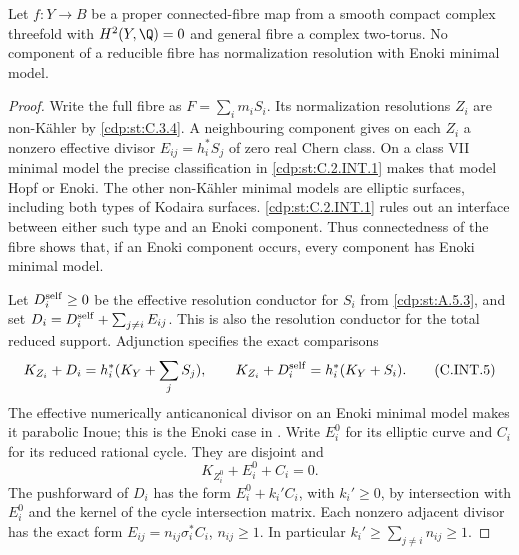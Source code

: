 
\begin{proposition}\label{cdp:st:C.2.INT.2}

Let $f:Y\to B$ be a proper connected-fibre map from a
smooth compact complex threefold with $H^2(Y,\Q)=0$
and general fibre a complex two-torus. No component
of a reducible fibre has normalization resolution
with Enoki minimal model.
\end{proposition}
\begin{proof}
Write the full fibre as $F=\sum_i m_iS_i$. Its
normalization resolutions $Z_i$ are non-K\"ahler by
\ref{cdp:st:C.3.4}. A neighbouring component gives on each $Z_i$
a nonzero effective divisor $E_{ij}=h_i^*S_j$ of
zero real Chern class. On a class VII minimal model
the precise classification in \ref{cdp:st:C.2.INT.1} makes that
model Hopf or Enoki. The other non-K\"ahler minimal
models are elliptic surfaces, including both types
of Kodaira surfaces. \ref{cdp:st:C.2.INT.1} rules out an interface
between either such type and an Enoki component.
Thus connectedness of the fibre shows that, if an
Enoki component occurs, every component has Enoki
minimal model.

Let $D_i^{\rm self}\ge0$ be the effective resolution
conductor for $S_i$ from \ref{cdp:st:A.5.3}, and set
$D_i=D_i^{\rm self}+\sum_{j\ne i}E_{ij}$. This is
also the resolution conductor for the total reduced
support. Adjunction specifies the exact comparisons
\[
 K_{Z_i}+D_i=h_i^*(K_Y+\sum_j S_j),\qquad
 K_{Z_i}+D_i^{\rm self}=h_i^*(K_Y+S_i).
 \tag{C.INT.5}\label{cdp:eq:C.INT.5}
\]
The effective numerically anticanonical divisor on
an Enoki minimal model makes it parabolic Inoue;
this is the Enoki case in
\cite[Lemma~2.22 and the following paragraph]{Dloussky2006}.
Write $E_i^0$ for its elliptic curve and $C_i$ for
its reduced rational cycle. They are disjoint and
\[
 K_{Z_i^0}+E_i^0+C_i=0.
 \tag{C.INT.6}\label{cdp:eq:C.INT.6}
\]
The pushforward of $D_i$ has the form
$E_i^0+k_i' C_i$, with $k_i'\ge0$, by intersection
with $E_i^0$ and the kernel of the cycle intersection
matrix. Each nonzero adjacent divisor has the exact
form $E_{ij}=n_{ij}\sigma_i^*C_i$, $n_{ij}\ge1$.
In particular $k_i'\ge\sum_{j\ne i}n_{ij}\ge1$.


\end{proof}
